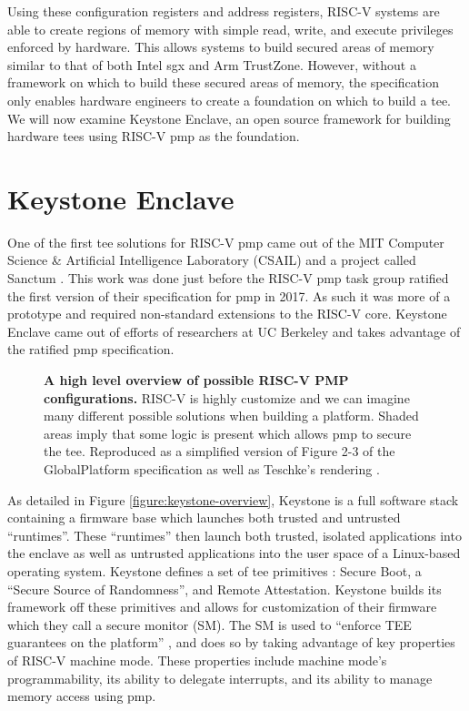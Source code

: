 Using these configuration registers and address registers, RISC-V systems are able to create regions of memory with simple read, write, and execute privileges enforced by hardware. This allows systems to build secured areas of memory similar to that of both Intel \gls{sgx} and Arm TrustZone. However, without a framework on which to build these secured areas of memory, the specification only enables hardware engineers to create a foundation on which to build a \gls{tee}. We will now examine Keystone Enclave, an open source framework for building hardware \glspl{tee} using RISC-V \gls{pmp} as the foundation.

\section{Keystone Enclave}
One of the first \gls{tee} solutions for RISC-V \gls{pmp} came out of the MIT Computer Science \& Artificial Intelligence Laboratory (CSAIL) and a project called Sanctum \cite{Costan2016a}. This work was done just before the RISC-V \gls{pmp} task group ratified the first version of their specification for \gls{pmp} in 2017. As such it was more of a prototype and required non-standard extensions to the RISC-V core. Keystone Enclave came out of efforts of researchers at UC Berkeley and takes advantage of the ratified \gls{pmp} specification.

\begin{figure}[ht]
\centering

\caption[High Level RISC-V PMP Overview]{\textbf{A high level overview of possible RISC-V PMP configurations.} RISC-V is highly customize and we can imagine many different possible solutions when building a platform. Shaded areas imply that some logic is present which allows \gls{pmp} to secure the \gls{tee}. Reproduced as a simplified version of Figure 2-3 of the GlobalPlatform specification \cite{GlobalPlatform2018} as well as Teschke's rendering \cite{TeschkeSGX}.}
\label{fig:rv-hl}
\end{figure}

As detailed in Figure \ref{figure:keystone-overview}, Keystone is a full software stack containing a firmware base which launches both trusted and untrusted ``runtimes''. These ``runtimes'' then launch both trusted, isolated applications into the enclave as well as untrusted applications into the user space of a Linux-based operating system. Keystone defines a set of \gls{tee} primitives \cite{lee2020keystone}: Secure Boot, a ``Secure Source of Randomness'', and Remote Attestation. Keystone builds its framework off these primitives and allows for customization of their firmware which they call a secure monitor (SM). The SM is used to ``enforce TEE guarantees on the platform'' \cite{lee2019keystone}, and does so by taking advantage of key properties of RISC-V machine mode. These properties include machine mode's programmability, its ability to delegate interrupts, and its ability to manage memory access using \gls{pmp}.

